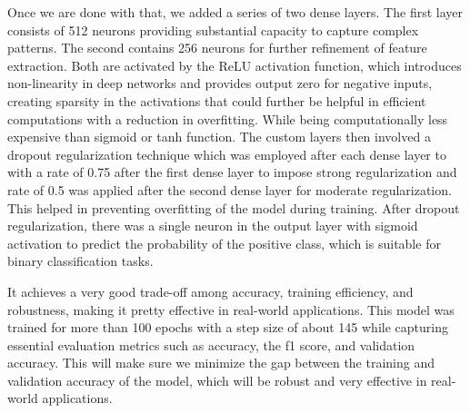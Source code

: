 \documentclass{ieeeaccess}
\begin{document}
Once we are done with that, we added a series of two dense layers. The first layer consists of 512 neurons providing substantial capacity to capture complex patterns. The second contains 256 neurons for further refinement of feature extraction. Both are activated by the ReLU activation function, which introduces non-linearity in deep networks and provides output zero for negative inputs, creating sparsity in the activations that could further be helpful in efficient computations with a reduction in overfitting. While being computationally less expensive than sigmoid or tanh function. The custom layers then involved a dropout regularization technique which was employed after each dense layer to with a rate of 0.75 after the first dense layer to impose strong regularization and rate of 0.5 was applied after the second dense layer for moderate regularization. This helped in preventing overfitting of the model during training. After dropout regularization, there was a single neuron in the output layer with sigmoid activation to predict the probability of the positive class, which is suitable for binary classification tasks.

It achieves a very good trade-off among accuracy, training efficiency, and robustness, making it pretty effective in real-world applications. This model was trained for more than 100 epochs with a step size of about 145 while capturing essential evaluation metrics such as accuracy, the f1 score, and validation accuracy. This will make sure we minimize the gap between the training and validation accuracy of the model, which will be robust and very effective in real-world applications.
\end{document}
